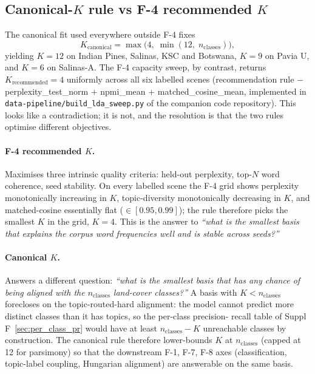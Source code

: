 \documentclass[11pt,a4paper]{article}
\begin{document}
\subsection{Canonical-$K$ rule vs F-4 recommended $K$}
\label{subsec:canonical-k}

The canonical fit used everywhere outside F-4 fixes
\begin{equation}
K_{\text{canonical}} = \max\!\big(4,\; \min(12,\; n_{\text{classes}})\big),
\end{equation}
yielding $K = 12$ on Indian Pines, Salinas, KSC and Botswana,
$K = 9$ on Pavia U, and $K = 6$ on Salinas-A. The F-4 capacity
sweep, by contrast, returns $K_{\text{recommended}} = 4$ uniformly
across all six labelled scenes (recommendation rule
$-$perplexity\_test\_norm $+$ npmi\_mean $+$ matched\_cosine\_mean,
implemented in \texttt{data-pipeline/build\_lda\_sweep.py} of the
companion code repository). This looks like a contradiction; it is
not, and the resolution is that the two rules optimise different
objectives.

\paragraph{F-4 recommended $K$.} Maximises three intrinsic quality
criteria: held-out perplexity, top-$N$ word coherence, seed
stability. On every labelled scene the F-4 grid shows perplexity
monotonically increasing in $K$, topic-diversity monotonically
decreasing in $K$, and matched-cosine essentially flat
($\in [0.95, 0.99]$); the rule therefore picks the smallest $K$
in the grid, $K = 4$. This is the answer to
\emph{``what is the smallest basis that explains the corpus word
frequencies well and is stable across seeds?''}

\paragraph{Canonical $K$.} Answers a different question:
\emph{``what is the smallest basis that has any chance of being
aligned with the $n_{\text{classes}}$ land-cover classes?''}
A basis with $K < n_{\text{classes}}$ forecloses on the
topic-routed-hard alignment: the model cannot predict more
distinct classes than it has topics, so the per-class precision-
recall table of Suppl F~\ref{sec:per_class_pr} would have at
least $n_{\text{classes}} - K$ unreachable classes by
construction. The canonical rule therefore lower-bounds $K$ at
$n_{\text{classes}}$ (capped at 12 for parsimony) so that the
downstream F-1, F-7, F-8 axes (classification, topic-label
coupling, Hungarian alignment) are answerable on the same
basis.
\end{document}
